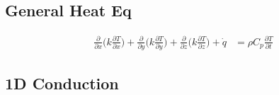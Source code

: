 \documentclass[11pt]{article}
\begin{document}
\clearpage

\subsection*{General Heat Eq}
\begin{align*}
    \frac{\partial}{\partial x}\Bigg(k\frac{\partial T}{\partial x}\Bigg) + \frac{\partial}{\partial y}\Bigg(k\frac{\partial T}{\partial y}\Bigg) + \frac{\partial}{\partial z}\Bigg(k\frac{\partial T}{\partial z}\Bigg) + \dot{q} &= \rho C_p \frac{\partial T}{\partial t}
\end{align*}

\subsection*{1D Conduction}
\end{document}
